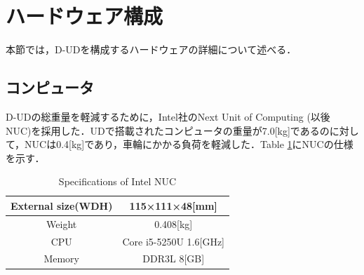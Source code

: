 \documentclass[12pt]{sonota/aislab}
\begin{document}


\section{ハードウェア構成}
本節では，D-UDを構成するハードウェアの詳細について述べる．
\subsection{コンピュータ}
D-UDの総重量を軽減するために，Intel社のNext Unit of Computing (以後 NUC)を採用した．UDで搭載されたコンピュータの重量が7.0[kg]であるのに対して，NUCは0.4[kg]であり，車輪にかかる負荷を軽減した．Table \ref{table:NUC}にNUCの仕様を示す．

\begin{table}[h]
	\caption{Specifications of Intel NUC}
	\label{table:NUC}
	\centering 
	\begin{tabular}[tbp]{|c|c|}
		\hline 
		External size(WDH) & 115×111×48[mm] \\\hline
		Weight & 0.408[kg] \\\hline
		CPU & Core i5-5250U 1.6[GHz] \\\hline
		Memory & DDR3L 8[GB] \\\hline
	\end{tabular}
\end{table}

\end{document}
